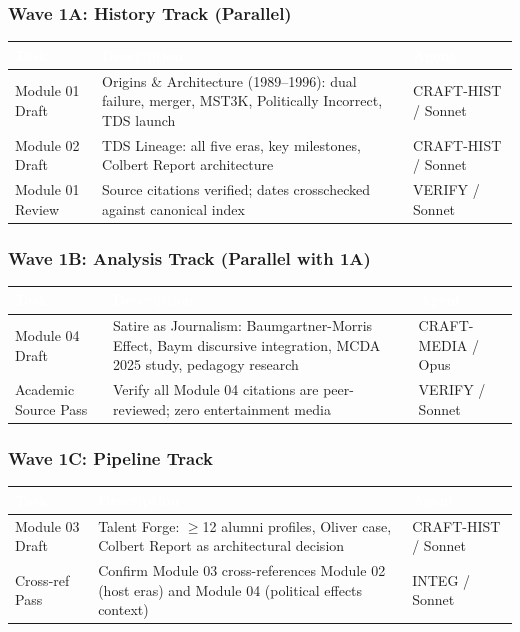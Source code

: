 \documentclass[11pt,letterpaper]{article}
\newcommand{\tableheader}[1]{\textbf{\sffamily\textcolor{white}{#1}}}
\begin{document}
\subsubsection{Wave 1A: History Track (Parallel)}

\begin{center}
\begin{tabularx}{\textwidth}{L{3.5cm}XC{2cm}}
\toprule
{}
\tableheader{Task} & \tableheader{Description} & \tableheader{Agent} \\
\midrule
Module 01 Draft & Origins \& Architecture (1989--1996): dual failure, merger, MST3K, Politically Incorrect, TDS launch & CRAFT-HIST / Sonnet \\
Module 02 Draft & TDS Lineage: all five eras, key milestones, Colbert Report architecture & CRAFT-HIST / Sonnet \\
Module 01 Review & Source citations verified; dates crosschecked against canonical index & VERIFY / Sonnet \\
\bottomrule
\end{tabularx}
\end{center}

\subsubsection{Wave 1B: Analysis Track (Parallel with 1A)}

\begin{center}
\begin{tabularx}{\textwidth}{L{3.5cm}XC{2cm}}
\toprule
{}
\tableheader{Task} & \tableheader{Description} & \tableheader{Agent} \\
\midrule
Module 04 Draft & Satire as Journalism: Baumgartner-Morris Effect, Baym discursive integration, MCDA 2025 study, pedagogy research & CRAFT-MEDIA / Opus \\
Academic Source Pass & Verify all Module 04 citations are peer-reviewed; zero entertainment media & VERIFY / Sonnet \\
\bottomrule
\end{tabularx}
\end{center}

\subsubsection{Wave 1C: Pipeline Track}

\begin{center}
\begin{tabularx}{\textwidth}{L{3.5cm}XC{2cm}}
\toprule
{}
\tableheader{Task} & \tableheader{Description} & \tableheader{Agent} \\
\midrule
Module 03 Draft & Talent Forge: $\geq$12 alumni profiles, Oliver case, Colbert Report as architectural decision & CRAFT-HIST / Sonnet \\
Cross-ref Pass & Confirm Module 03 cross-references Module 02 (host eras) and Module 04 (political effects context) & INTEG / Sonnet \\
\bottomrule
\end{tabularx}
\end{center}
\end{document}
